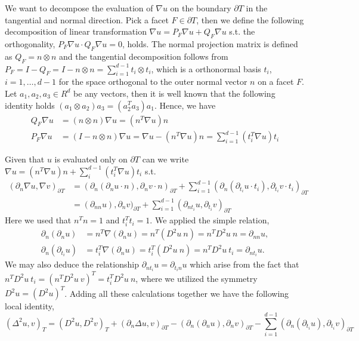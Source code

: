 We want to decompose the evaluation of $\nabla  u $ on the boundary $\partial T$ in the tangential and normal direction. Pick a facet  $F \in \partial T$, then we define the following decomposition of linear transformation $\nabla u = P_{F}\nabla u  + Q_{F}  \nabla u  $ s.t. the
orthogonality, $
P_{F} \nabla u  \cdot Q_{F}  \nabla u = 0$, holds. The normal projection matrix is defined as $Q_{F} = n \otimes n $ and the tangential decomposition follows from $ P_{F} = I - Q_{F} = I - n \otimes n  =  \sum_{i=1}^{d-1} t_{i} \otimes t_i$, which
is a orthonormal basis $t_{i}$, $i = 1, \ldots, d-1$ for the space orthogonal to the outer normal vector $n$ on a facet $F$. Let $ a_{1}, a_{2}, a_{3} \in R^{d}$ be any vectors, then it is well known that the following identity holds $ ( a_{1}
\otimes a_{2}  ) a_{3} = ( a_{2}^{T}  a_{3}) a_{1} $. Hence, we have
\begin{equation}
\label{eq:projection}
    \begin{split}
   Q_{F} \nabla u & = ( n \otimes n ) \nabla u =  (n^{T} \nabla u)n \\
   P_{F} \nabla u & =( I - n \otimes n ) \nabla u =   \nabla u  - (n^{T}  \nabla u)n =  \sum_{ i =1 }^{d-1} ( t_{i}^{T}  \nabla u ) t_{i}
    \end{split}
\end{equation}

Given that $u$ is evaluated only on $\partial T$ can we write
$\nabla u = \left( n^{T} \nabla u   \right) n + \sum_i^{d-1} \left( t_i^{T} \nabla u   \right) t_i$ s.t.
\[
    \begin{split}
(  \partial_n\nabla u, \nabla v ) _{\partial_{} T  } & =  ( \partial _{n} ( \partial_{n}u \cdot n), \partial _{n} v \cdot n )_{\partial T}   +\sum_{i=1}^{d-1} ( \partial _{n} ( \partial_{t_{i}}u \cdot t_{i}), \partial _{t_{i}} v \cdot t_{i} )_{\partial T} \\
& =  ( \partial _{nn} u ), \partial _{n} v  )_{\partial T}+\sum_{i=1}^{d-1} ( \partial _{n t_{i}}u , \partial _{t_{i}} v  )_{\partial T}
    \end{split}
\]
Here we used that $n^{T} n = 1$ and $t_{i}^{T} t_{i} = 1$.
We applied the simple relation,
    \begin{align*}
\partial_n (\partial_n u)  & = n^T \nabla (\partial_n u)  = n ^T (D^2 u \ n)  = n^{T} D^2 u \ n = \partial _{nn} u, \\
\partial_n (\partial_{t_{i}} u)  & = t_{i}^T \nabla (\partial_n u)  = t_i^T (D^2 u \ n )   = n^{T} D^2 u \ t_{i} = \partial _{n t_{i}} u.
    \end{align*}
We may also deduce the relationship $\partial _{nt_{i}} u = \partial _{t_{i}n}u$ which arise from the fact that $n^{T} D^2u \ t_{i} = ( n^{T} D^2u \ v )^T = t_{i}^{T}  D^2u \  n$, where we utilized the symmetry $D^2u = ( D^2u) ^{T} $.
Adding all these calculations together we have the following local identity,
\[
( \Delta ^2 u, v) _{T}   = ( D^2 u, D^2v)_{T } + ( \partial _{n}  \Delta u, v )_{\partial T} -( \partial _{n} ( \partial_{n}u ), \partial _{n} v  )_{\partial T}-\sum_{i=1}^{d-1} ( \partial _{n} ( \partial_{t_{i}}u ), \partial _{t_{i}} v  )_{\partial T}
\]

